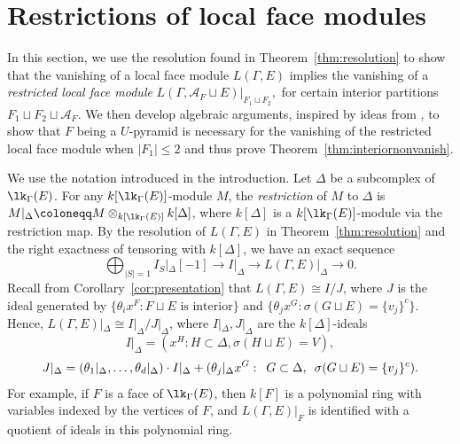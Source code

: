\section{Restrictions of local face modules}
In this section, we use the resolution found in Theorem~\ref{thm:resolution} to show that the vanishing of a local face module $L(\Gamma, E)$ implies the vanishing of a \emph{restricted local face module} $L(\Gamma, \mathcal{A}_F \sqcup E)|_{F_1 \sqcup F_2},$ for certain interior partitions $F_1 \sqcup F_2  \sqcup  \mathcal{A}_F$.  We then develop algebraic arguments, inspired by ideas from \cite{dMGPSS20}, to show that $F$ being a $U$-pyramid is necessary for the vanishing of the restricted local face module when $\vert F_1 \vert \le 2$ and thus prove Theorem~\ref{thm:interiornonvanish}. 

We use the notation introduced in the introduction. Let $\Delta$ be a subcomplex of $\lk_{\Gamma}(E)$. For any $k[\lk_{\Gamma}(E)]$-module $M$, the \emph{restriction} of $M$ to $\Delta$ is $M|_{\Delta}  \coloneqq  M \otimes_{k[\lk_{\Gamma}(E)]} k[\Delta]$, where $k[\Delta]$ is a $k[\lk_{\Gamma}(E)]$-module via the restriction map. By the resolution of $L(\Gamma,E)$ in  Theorem~\ref{thm:resolution} and the right exactness of tensoring with $k[\Delta]$, we have an exact sequence 
\begin{equation}\label{e:restrict}
 \bigoplus_{|S| = 1} I_{S}|_\Delta[-1] \to I|_\Delta \to L(\Gamma,E)|_\Delta \to 0.
\end{equation}
Recall from Corollary~\ref{cor:presentation} that $L(\Gamma, E) \cong I/J$, where $J$ is the ideal generated by $\{\theta_i x^{F} : F \sqcup E \mbox{ is interior}\}$ and $\{\theta_{j} x^G : \sigma(G \sqcup E) = \{v_j\}^c \}$.  Hence, $L(\Gamma,E)|_\Delta \cong I|_\Delta/J|_\Delta$, where $I|_\Delta,J|_\Delta$ are the $k[\Delta]$-ideals
\begin{equation}\label{eq:Ires}
I|_\Delta = (x^H :  H \subset \Delta, \sigma(H \sqcup E) = V),
\end{equation}
\begin{equation}\label{eq:Jres}
J|_\Delta = (\theta_1|_\Delta,\ldots,\theta_{d}|_\Delta) \cdot I|_\Delta + (\theta_{j}|_{\Delta} x^G: \enskip G \subset \Delta, \enskip \sigma(G \sqcup E) = \{v_j\}^c).    
\end{equation}
For example, if $F$ is a face of $\lk_{\Gamma}(E)$, then $k[F]$ is a polynomial ring with variables indexed by the vertices of $F$, and 
$L(\Gamma, E)|_{F}$ is identified with  a quotient of ideals in this polynomial ring.



